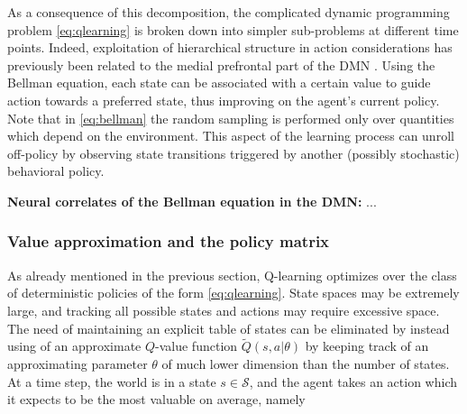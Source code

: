 \documentclass[10pt,letterpaper]{article}
\begin{document}
As a consequence of this decomposition, the complicated dynamic programming
problem \eqref{eq:qlearning}
is broken down into simpler sub-problems at different time points.
Indeed,
exploitation of hierarchical structure in action considerations
has previously been related to the medial prefrontal part of the DMN
\citep{koechlin1999role, braver2002role}.
Using the Bellman equation, each state can be associated with a certain value
to guide action towards a preferred state, thus improving on the agent's current policy.
Note that in \eqref{eq:bellman} the random sampling
is performed only over quantities which
depend on the environment.
This aspect of the learning process
can unroll off-policy by observing state transitions
triggered by another (possibly stochastic) behavioral policy.

\begin{mdframed}
  \textbf{ Neural correlates of the Bellman equation in the DMN:}
  ...
\end{mdframed}

\subsubsection{Value approximation and the policy matrix}
As already mentioned in the previous section, Q-learning optimizes over the class of
deterministic policies of the form \eqref{eq:qlearning}. State spaces may be extremely large,
and tracking all possible states and actions may require excessive space.
The need of maintaining an explicit table of
states can be eliminated by instead using of an approximate $Q$-value function $\tilde{Q}(s,a|\theta)$
by keeping track of an approximating parameter $\theta$ of much lower dimension than the number of states.
At a time step, the world is in a state $s \in \mathcal S$, and the agent takes an
action which it expects to be the most valuable on average, namely
\end{document}
